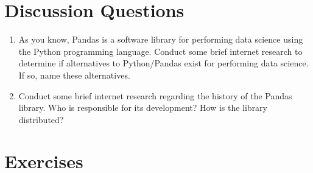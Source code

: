 \documentclass{book}
\begin{document}
\section{Discussion Questions}
\begin{enumerate}
\item As you know, Pandas is a software library for performing data science using the Python programming language. Conduct some brief internet research to determine if alternatives to Python/Pandas exist for performing data science. If so, name these alternatives.
\item Conduct some brief internet research regarding the history of the Pandas library. Who is responsible for its development? How is the library distributed? 
\end{enumerate}
\section{Exercises}
\end{document}
